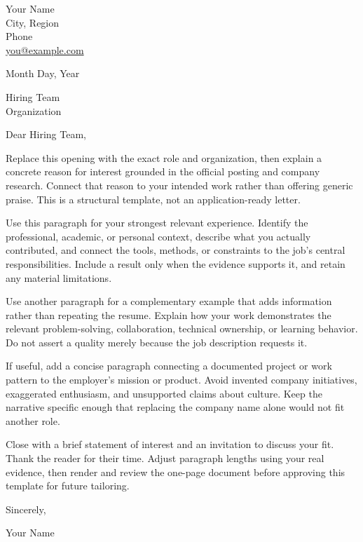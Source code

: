 \documentclass[letterpaper,10pt]{article}
\begin{document}
\thispagestyle{empty}
\begin{flushleft}
Your Name \\
City, Region \\
Phone \\
\href{mailto:you@example.com}{you@example.com}
\end{flushleft}
\vspace{0.5em}
Month Day, Year

Hiring Team \\
Organization

Dear Hiring Team,

Replace this opening with the exact role and organization, then explain a concrete reason for interest grounded in the official posting and company research. Connect that reason to your intended work rather than offering generic praise. This is a structural template, not an application-ready letter.

Use this paragraph for your strongest relevant experience. Identify the professional, academic, or personal context, describe what you actually contributed, and connect the tools, methods, or constraints to the job's central responsibilities. Include a result only when the evidence supports it, and retain any material limitations.

Use another paragraph for a complementary example that adds information rather than repeating the resume. Explain how your work demonstrates the relevant problem-solving, collaboration, technical ownership, or learning behavior. Do not assert a quality merely because the job description requests it.

If useful, add a concise paragraph connecting a documented project or work pattern to the employer's mission or product. Avoid invented company initiatives, exaggerated enthusiasm, and unsupported claims about culture. Keep the narrative specific enough that replacing the company name alone would not fit another role.

Close with a brief statement of interest and an invitation to discuss your fit. Thank the reader for their time. Adjust paragraph lengths using your real evidence, then render and review the one-page document before approving this template for future tailoring.

Sincerely,

Your Name
\end{document}

